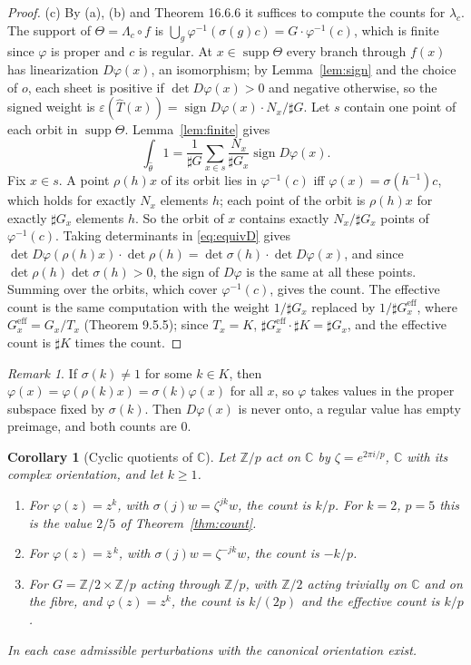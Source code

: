 \documentclass[11pt,a4paper]{article}
\theoremstyle{plain}
\newtheorem{corollary}[theorem]{Corollary}
\theoremstyle{definition}
\theoremstyle{remark}
\newtheorem{remark}[theorem]{Remark}
\newcommand{\C}{\mathbb{C}}
\newcommand{\Z}{\mathbb{Z}}
\newcommand{\card}{\sharp}
\newcommand{\supp}{\operatorname{supp}}
\begin{document}
\begin{proof}
(c) By (a), (b) and Theorem 16.6.6 it suffices to compute the counts for $\lambda_c$. The support of
$\Theta=\Lambda_c\circ f$ is $\bigcup_g\varphi^{-1}(\sigma(g)c)=G\cdot\varphi^{-1}(c)$, which is finite since
$\varphi$ is proper and $c$ is regular. At $x\in\supp\Theta$ every branch through $f(x)$ has
linearization $D\varphi(x)$, an isomorphism; by Lemma~\ref{lem:sign} and the choice of $o$, each sheet is
positive if $\det D\varphi(x)>0$ and negative otherwise, so the signed weight is
$\varepsilon(\hat T(x))=\operatorname{sign}D\varphi(x)\cdot N_x/\card G$. Let $s$ contain one point of
each orbit in $\supp\Theta$. Lemma~\ref{lem:finite} gives
\[
  \int_{\hat\theta}1=\frac1{\card G}\sum_{x\in s}\frac{N_x}{\card G_x}\operatorname{sign}D\varphi(x).
\]
Fix $x\in s$. A point $\rho(h)x$ of its orbit lies in $\varphi^{-1}(c)$ iff $\varphi(x)=\sigma(h^{-1})c$, which
holds for exactly $N_x$ elements $h$; each point of the orbit is $\rho(h)x$ for exactly $\card G_x$
elements $h$. So the orbit of $x$ contains exactly $N_x/\card G_x$ points of $\varphi^{-1}(c)$. Taking
determinants in \eqref{eq:equivD} gives
$\det D\varphi(\rho(h)x)\cdot\det\rho(h)=\det\sigma(h)\cdot\det D\varphi(x)$, and since
$\det\rho(h)\det\sigma(h)>0$, the sign of $D\varphi$ is the same at all these points. Summing over the
orbits, which cover $\varphi^{-1}(c)$, gives the count. The effective count is the same computation with
the weight $1/\card G_x$ replaced by $1/\card G_x^{\mathrm{eff}}$, where $G_x^{\mathrm{eff}}=G_x/T_x$
(Theorem 9.5.5); since $T_x=K$, $\card G_x^{\mathrm{eff}}\cdot\card K=\card G_x$, and the effective count
is $\card K$ times the count.
\end{proof}

\begin{remark}
If $\sigma(k)\ne1$ for some $k\in K$, then $\varphi(x)=\varphi(\rho(k)x)=\sigma(k)\varphi(x)$ for all $x$, so
$\varphi$ takes values in the proper subspace fixed by $\sigma(k)$. Then $D\varphi(x)$ is never onto, a
regular value has empty preimage, and both counts are $0$.
\end{remark}

\begin{corollary}[Cyclic quotients of $\C$]\label{cor:cyclic}
Let $\Z/p$ act on $\C$ by $\zeta=e^{2\pi i/p}$, $\C$ with its complex orientation, and let $k\ge1$.
\begin{enumerate}[label=(\alph*)]
\item For $\varphi(z)=z^k$, with $\sigma(j)w=\zeta^{jk}w$, the count is $k/p$. For $k=2$, $p=5$ this is the
  value $2/5$ of Theorem~\ref{thm:count}.
\item For $\varphi(z)=\bar z^{\,k}$, with $\sigma(j)w=\zeta^{-jk}w$, the count is $-k/p$.
\item For $G=\Z/2\times\Z/p$ acting through $\Z/p$, with $\Z/2$ acting trivially on $\C$ and on the
  fibre, and $\varphi(z)=z^k$, the count is $k/(2p)$ and the effective count is $k/p$.
\end{enumerate}
In each case admissible perturbations with the canonical orientation exist.
\end{corollary}
\end{document}
